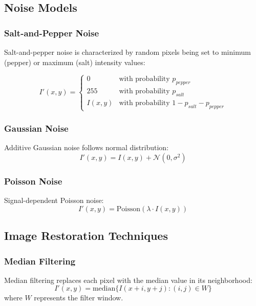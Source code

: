 \documentclass[a4paper, journal]{IEEEtran}
\begin{document}
\subsection{Noise Models}
\subsubsection{Salt-and-Pepper Noise}
Salt-and-pepper noise is characterized by random pixels being set to minimum (pepper) or maximum (salt) intensity values:

\begin{equation}
    I'(x,y) = \begin{cases}
        0      & \text{with probability } p_{pepper}            \\
        255    & \text{with probability } p_{salt}              \\
        I(x,y) & \text{with probability } 1-p_{salt}-p_{pepper}
    \end{cases}
\end{equation}

\subsubsection{Gaussian Noise}
Additive Gaussian noise follows normal distribution:
\begin{equation}
    I'(x,y) = I(x,y) + \mathcal{N}(0, \sigma^2)
\end{equation}

\subsubsection{Poisson Noise}
Signal-dependent Poisson noise:
\begin{equation}
    I'(x,y) = \text{Poisson}(\lambda \cdot I(x,y))
\end{equation}

\subsection{Image Restoration Techniques}
\subsubsection{Median Filtering}
Median filtering replaces each pixel with the median value in its neighborhood:
\begin{equation}
    I'(x,y) = \text{median}\{I(x+i, y+j) : (i,j) \in W\}
\end{equation}
where $W$ represents the filter window.
\end{document}
